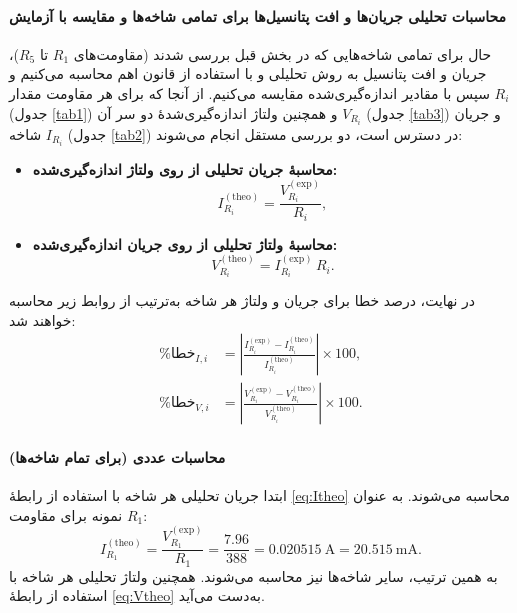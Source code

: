 \documentclass[a4paper, 11pt]{article}
\begin{document}
\paragraph{محاسبات تحلیلی جریان‌ها و افت پتانسیل‌ها برای تمامی شاخه‌ها و مقایسه با آزمایش}

حال برای تمامی شاخه‌هایی که در بخش قبل بررسی شدند (مقاومت‌های $R_1$ تا $R_5$)، جریان و افت پتانسیل به روش تحلیلی و با استفاده از قانون اهم محاسبه می‌کنیم و سپس با مقادیر اندازه‌گیری‌شده مقایسه می‌کنیم. از آنجا که برای هر مقاومت مقدار $R_i$ (جدول \ref{tab1}) و همچنین ولتاژ اندازه‌گیری‌شدهٔ دو سر آن $V_{R_i}$ (جدول \ref{tab3}) و جریان شاخه $I_{R_i}$ (جدول \ref{tab2}) در دسترس است، دو بررسی مستقل انجام می‌شوند:

\begin{itemize}
\item \textbf{محاسبهٔ جریان تحلیلی از روی ولتاژ اندازه‌گیری‌شده:}
\begin{equation}
I_{R_i}^{(\mathrm{theo})} = \frac{V_{R_i}^{(\mathrm{exp})}}{R_i},
\label{eq:Itheo}
\end{equation}

\item \textbf{محاسبهٔ ولتاژ تحلیلی از روی جریان اندازه‌گیری‌شده:}
\begin{equation}
V_{R_i}^{(\mathrm{theo})} = I_{R_i}^{(\mathrm{exp})}\,R_i.
\label{eq:Vtheo}
\end{equation}
\end{itemize}

در نهایت، درصد خطا برای جریان و ولتاژ هر شاخه به‌ترتیب از روابط زیر محاسبه خواهند شد:
\begin{align}
\%\text{خطا}_{I,i} &=
\left|\frac{I_{R_i}^{(\mathrm{exp})}-I_{R_i}^{(\mathrm{theo})}}{I_{R_i}^{(\mathrm{theo})}}\right|\times 100,
\label{eq:errI}
\\
\%\text{خطا}_{V,i} &=
\left|\frac{V_{R_i}^{(\mathrm{exp})}-V_{R_i}^{(\mathrm{theo})}}{V_{R_i}^{(\mathrm{theo})}}\right|\times 100.
\label{eq:errV}
\end{align}

\paragraph{محاسبات عددی (برای تمام شاخه‌ها)}
ابتدا جریان تحلیلی هر شاخه با استفاده از رابطهٔ \eqref{eq:Itheo} محاسبه می‌شوند. به عنوان نمونه برای مقاومت $R_1$:
\[
I_{R_1}^{(\mathrm{theo})}=\frac{V_{R_1}^{(\mathrm{exp})}}{R_1}
=\frac{7.96}{388}
=0.020515~\mathrm{A}
=20.515~\mathrm{mA}.
\]
به همین ترتیب، سایر شاخه‌ها نیز محاسبه می‌شوند. همچنین ولتاژ تحلیلی هر شاخه با استفاده از رابطهٔ \eqref{eq:Vtheo} به‌دست می‌آید.
\end{document}

